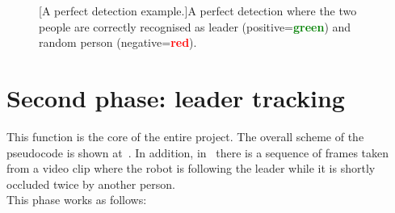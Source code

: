 \begin{figure}[!h]
\begin{minipage}{.49\textwidth}
		\captionsetup{margin=0.2cm}
		[A perfect detection example.]{A perfect detection where the two people are correctly recognised as leader (positive=\textbf{\textcolor{green}{green}}) and random person (negative=\textbf{\textcolor{red}{red}}).}
		\label{fig:doubleDetectionOk}
	\end{minipage}
\end{figure}


\section{Second phase: leader tracking} \label{sec:leaderTrackingPhase}
This function is the core of the entire project. The overall scheme of the pseudocode is shown at~. In addition, in~ there is a sequence of frames taken from a video clip where the robot is following the leader while it is shortly occluded twice by another person.\\
This phase works as follows:
